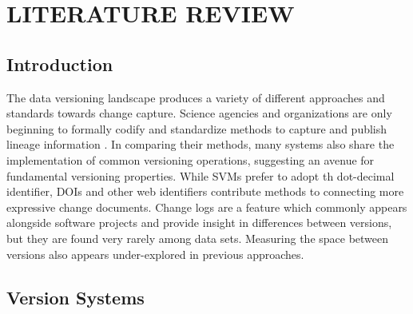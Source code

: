 
\chapter{LITERATURE REVIEW}\label{ch:prevwork}

\section{Introduction}

The data versioning landscape produces a variety of different approaches and standards towards change capture.
Science agencies and organizations are only beginning to formally codify and standardize methods to capture and publish lineage information \cite{MatthewS.Mayernik201312-039}.
In comparing their methods, many systems also share the implementation of common versioning operations, suggesting an avenue for fundamental versioning properties.
While SVMs prefer to adopt th dot-decimal identifier, DOIs and other web identifiers contribute methods to connecting more expressive change documents.
Change logs are a feature which commonly appears alongside software projects and provide insight in differences between versions, but they are found very rarely among data sets.
Measuring the space between versions also appears under-explored in previous approaches.

\section{Version Systems} \label{sec:system}

